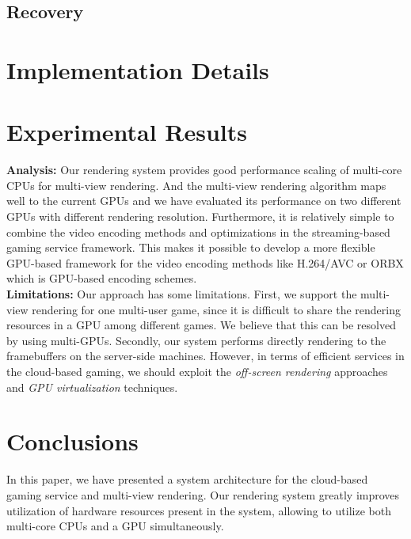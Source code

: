 \documentclass{sig-alternate}
\begin{document}
\subsection{Recovery}

\section{Implementation Details}

\section{Experimental Results}

    \noindent
    {\bf Analysis:} Our rendering system provides good performance scaling of multi-core CPUs for multi-view rendering.
    And the multi-view rendering algorithm maps well to the current GPUs and we have evaluated its performance on two different GPUs with different rendering resolution.
    Furthermore, it is relatively simple to combine the video encoding methods and optimizations in the streaming-based gaming service framework. This makes it possible to develop a more flexible GPU-based framework for the video encoding methods like H.264/AVC or ORBX which is GPU-based encoding schemes.\\

   \noindent
    {\bf Limitations:}
    Our approach has some limitations.
    First, we support the multi-view rendering for one multi-user game, since it is difficult to share the rendering resources in a GPU among different games. We believe that this can be resolved by using multi-GPUs.
    Secondly, our system performs directly rendering to the framebuffers on the server-side machines.
    However, in terms of efficient services in the cloud-based gaming, we should exploit the \emph{off-screen rendering} approaches and \emph{GPU virtualization} techniques.

\section{Conclusions}
    \label{sc:Conclusion}
    In this paper, we have presented a system architecture for the cloud-based gaming service and multi-view rendering.
    Our rendering system greatly improves utilization of hardware resources present in the system, allowing to utilize both multi-core CPUs and a GPU simultaneously.
\end{document}
